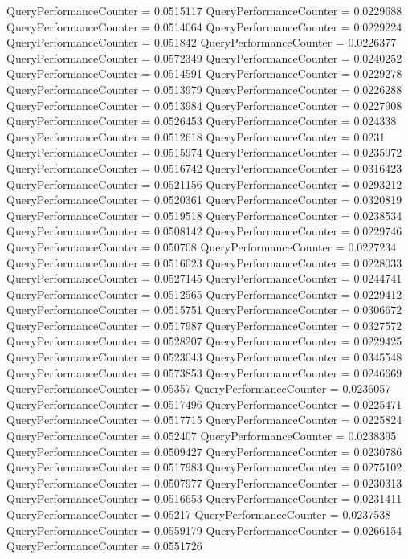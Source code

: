 \documentclass[9pt]{article}
\theoremstyle{plain}
\theoremstyle{definition}
\theoremstyle{remark}
\numberwithin{equation}{section}
\begin{document}
QueryPerformanceCounter  =  0.0515117
QueryPerformanceCounter  =  0.0229688
QueryPerformanceCounter  =  0.0514064
QueryPerformanceCounter  =  0.0229224
QueryPerformanceCounter  =  0.051842
QueryPerformanceCounter  =  0.0226377
QueryPerformanceCounter  =  0.0572349
QueryPerformanceCounter  =  0.0240252
QueryPerformanceCounter  =  0.0514591
QueryPerformanceCounter  =  0.0229278
QueryPerformanceCounter  =  0.0513979
QueryPerformanceCounter  =  0.0226288
QueryPerformanceCounter  =  0.0513984
QueryPerformanceCounter  =  0.0227908
QueryPerformanceCounter  =  0.0526453
QueryPerformanceCounter  =  0.024338
QueryPerformanceCounter  =  0.0512618
QueryPerformanceCounter  =  0.0231
QueryPerformanceCounter  =  0.0515974
QueryPerformanceCounter  =  0.0235972
QueryPerformanceCounter  =  0.0516742
QueryPerformanceCounter  =  0.0316423
QueryPerformanceCounter  =  0.0521156
QueryPerformanceCounter  =  0.0293212
QueryPerformanceCounter  =  0.0520361
QueryPerformanceCounter  =  0.0320819
QueryPerformanceCounter  =  0.0519518
QueryPerformanceCounter  =  0.0238534
QueryPerformanceCounter  =  0.0508142
QueryPerformanceCounter  =  0.0229746
QueryPerformanceCounter  =  0.050708
QueryPerformanceCounter  =  0.0227234
QueryPerformanceCounter  =  0.0516023
QueryPerformanceCounter  =  0.0228033
QueryPerformanceCounter  =  0.0527145
QueryPerformanceCounter  =  0.0244741
QueryPerformanceCounter  =  0.0512565
QueryPerformanceCounter  =  0.0229412
QueryPerformanceCounter  =  0.0515751
QueryPerformanceCounter  =  0.0306672
QueryPerformanceCounter  =  0.0517987
QueryPerformanceCounter  =  0.0327572
QueryPerformanceCounter  =  0.0528207
QueryPerformanceCounter  =  0.0229425
QueryPerformanceCounter  =  0.0523043
QueryPerformanceCounter  =  0.0345548
QueryPerformanceCounter  =  0.0573853
QueryPerformanceCounter  =  0.0246669
QueryPerformanceCounter  =  0.05357
QueryPerformanceCounter  =  0.0236057
QueryPerformanceCounter  =  0.0517496
QueryPerformanceCounter  =  0.0225471
QueryPerformanceCounter  =  0.0517715
QueryPerformanceCounter  =  0.0225824
QueryPerformanceCounter  =  0.052407
QueryPerformanceCounter  =  0.0238395
QueryPerformanceCounter  =  0.0509427
QueryPerformanceCounter  =  0.0230786
QueryPerformanceCounter  =  0.0517983
QueryPerformanceCounter  =  0.0275102
QueryPerformanceCounter  =  0.0507977
QueryPerformanceCounter  =  0.0230313
QueryPerformanceCounter  =  0.0516653
QueryPerformanceCounter  =  0.0231411
QueryPerformanceCounter  =  0.05217
QueryPerformanceCounter  =  0.0237538
QueryPerformanceCounter  =  0.0559179
QueryPerformanceCounter  =  0.0266154
QueryPerformanceCounter  =  0.0551726
\end{document}

